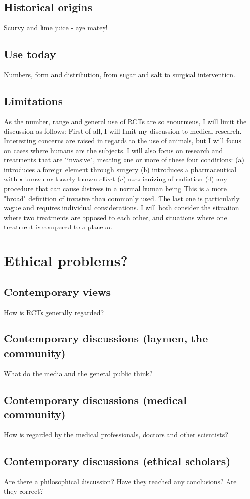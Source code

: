 \documentclass[12p]{article}
\begin{document}
\subsection*{Historical origins}
Scurvy and lime juice - aye matey!
\subsection*{Use today}
Numbers, form and distribution, from sugar and salt to surgical intervention.
\subsection*{Limitations}
As the number, range and general use of RCTs are so enourmeus, I will limit the discussion as follows:
First of all, I will limit my discussion to medical research.
Interesting concerns are raised in regards to the use of animals, but I will focus on cases where humans are the subjects.
I will also focus on research and treatments that are "invasive", meating one or more of these four conditions:
(a) introduces a foreign element through surgery 
(b) introduces a pharmaceutical with a known or loosely known effect
(c) uses ionizing of radiation
(d) any procedure that can cause distress in a normal human being
This is a more "broad" definition of invasive than commonly used.
The last one is particularly vague and requires individual considerations.
I will both consider the situation where two treatments are opposed to each other, and situations where one treatment is compared to a placebo.
\section*{Ethical problems?}
\subsection*{Contemporary views}
How is RCTs generally regarded?
\subsection*{Contemporary discussions (laymen, the community)}
What do the media and the general public think?
\subsection*{Contemporary discussions (medical community)}
How is regarded by the medical professionals, doctors and other scientists?
\subsection*{Contemporary discussions (ethical scholars)}
Are there a philosophical discussion? Have they reached any conclusions? Are they correct?
\end{document}
